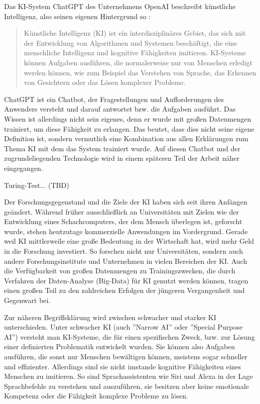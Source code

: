 \documentclass[a4paper,12pt, german]{report}
\begin{document}
Das KI-System ChatGPT des Unternehmens OpenAI beschreibt künstliche Intelligenz, also seinen eigenen Hintergrund so \cite{04}:
\begin{quote}
  Künstliche Intelligenz (KI) ist ein interdisziplinäres Gebiet, das sich mit der Entwicklung von Algorithmen und Systemen beschäftigt, die eine menschliche Intelligenz und kognitive Fähigkeiten imitieren. KI-Systeme können Aufgaben ausführen, die normalerweise nur von Menschen erledigt werden können, wie zum Beispiel das Verstehen von Sprache, das Erkennen von Gesichtern oder das Lösen komplexer Probleme.
\end{quote}

ChatGPT ist ein Chatbot, der Fragestellungen und Aufforderungen des Anwenders versteht und darauf antwortet bzw. die Aufgaben ausführt. Das Wissen ist allerdings nicht sein eigenes, denn er wurde mit großen Datenmengen trainiert, um diese Fähigkeit zu erlangen. Das beutet, dass dies nicht seine eigene Definition ist, sondern vermutlich eine Kombination aus allen Erklärungen zum Thema KI mit dem das System trainiert wurde. Auf diesen Chatbot und der zugrundeliegenden Technologie wird in einem späteren Teil der Arbeit näher eingegangen.

Turing-Test... (TBD)

Der Forschungsgegenstand und die Ziele der KI haben sich seit ihren Anfängen geändert. Während früher ausschließlich an Universitäten mit Zielen wie der Entwicklung eines Schachcomputers, der dem Mensch überlegen ist, geforscht wurde, stehen heutzutage kommerzielle Anwendungen im Vordergrund. 
Gerade weil KI mittlerweile eine große Bedeutung in der Wirtschaft hat, wird mehr Geld in die Forschung investiert. So forschen nicht nur Universitäten, sondern auch andere Forschungsinstitute und Unternehmen in vielen Bereichen der KI. Auch die Verfügbarkeit von großen Datenmengen zu Trainingszwecken, die durch Verfahren der Daten-Analyse (Big-Data) für KI genutzt werden können, tragen einen großen Teil zu den zahlreichen Erfolgen der jüngeren Vergangenheit und Gegenwart bei. \cite{10}

Zur näheren Begriffsklärung wird zwischen schwacher und starker KI unterschieden. Unter schwacher KI (auch ''Narrow AI'' oder ''Special Purpose AI'')  versteht man KI-Systeme, die für einen spezifischen Zweck, bzw. zur Lösung einer definierten Problematik entwickelt wurden. Sie können also Aufgaben ausführen, die sonst nur Menschen bewältigen können, meistens sogar schneller und effizienter. Allerdings sind sie nicht imstande kognitive Fähigkeiten eines Menschen zu imitieren. So sind Sprachassistenten wie Siri und Alexa in der Lage Sprachbefehle zu verstehen und auszuführen, sie besitzen aber keine emotionale Kompetenz oder die Fähigkeit komplexe Probleme zu lösen. \cite{01}\cite{15}
\end{document}
